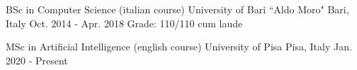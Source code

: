 

\begin{cventries}

  \cventry
    {BSc in Computer Science (italian course)} %
    {University of Bari ``Aldo Moro"} %
    {Bari, Italy} %
    {Oct. 2014 - Apr. 2018} %
    {Grade: 110/110 cum laude}
    
  \cventry
    {MSc in Artificial Intelligence (english course)} %
    {University of Pisa} %
    {Pisa, Italy} %
    {Jan. 2020 - Present} %
    {}

\end{cventries}

